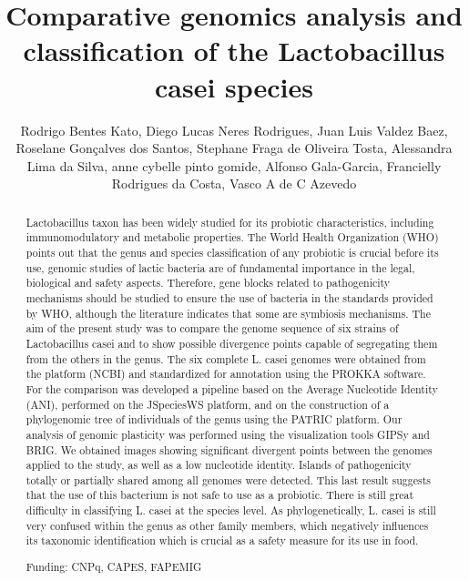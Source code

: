 \documentclass[twoside]{article}
\title{\vspace{-15mm}\fontsize{24pt}{10pt}\selectfont\textbf{ Comparative genomics analysis and classification of the Lactobacillus casei species }} %
\author{ Rodrigo Bentes Kato, Diego Lucas Neres Rodrigues, Juan Luis Valdez Baez, Roselane Gon\c{c}alves dos Santos, Stephane Fraga de Oliveira Tosta, Alessandra Lima da Silva, anne cybelle pinto gomide, Alfonso Gala-Garcia, Francielly Rodrigues da Costa, Vasco A de C Azevedo }
\affil{ UFMG }
\date{}
\begin{document}
  
  
  \maketitle %
  
  
  \thispagestyle{fancy} %
  
  
  \begin{abstract}
  Lactobacillus taxon has been widely studied for its probiotic characteristics,  including immunomodulatory and metabolic properties. The World Health Organization (WHO) points out that the genus and species classification of any probiotic is crucial before its use,  genomic studies of lactic bacteria are of fundamental importance in the legal,  biological and safety aspects. Therefore,  gene blocks related to pathogenicity mechanisms should be studied to ensure the use of bacteria in the standards provided by WHO,  although the literature indicates that some are symbiosis mechanisms. The aim of the present study was to compare the genome sequence of six strains of Lactobacillus casei and to show possible divergence points capable of segregating them from the others in the genus. The six complete L. casei genomes were obtained from the platform (NCBI) and standardized for annotation using the PROKKA software. For the comparison was developed a pipeline based on the Average Nucleotide Identity (ANI),  performed on the JSpeciesWS platform,  and on the construction of a phylogenomic tree of individuals of the genus using the PATRIC platform. Our analysis of genomic plasticity was performed using the visualization tools GIPSy and BRIG. We obtained images showing significant divergent points between the genomes applied to the study,  as well as a low nucleotide identity. Islands of pathogenicity totally or partially shared among all genomes were detected. This last result suggests that the use of this bacterium is not safe to use as a probiotic. There is still great difficulty in classifying L. casei at the species level. As phylogenetically,  L. casei is still very confused within the genus as other family members,  which negatively influences its taxonomic identification which is crucial as a safety measure for its use in food.
  
  Funding: CNPq,  CAPES,  FAPEMIG \\ 
  \end{abstract}
  
\end{document}
